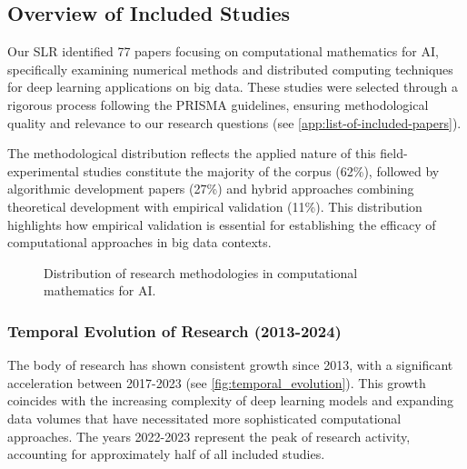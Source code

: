 \documentclass[acmsmall]{acmart}
\begin{document}
\subsection{Overview of Included Studies}\label{subsec:overview-of-included-studies}
Our SLR identified 77 papers focusing on computational mathematics for AI, specifically examining numerical methods and distributed computing techniques for deep learning applications on big data. These studies were selected through a rigorous process following the PRISMA guidelines, ensuring methodological quality and relevance to our research questions (see \cref{app:list-of-included-papers}).

The methodological distribution reflects the applied nature of this field-experimental studies constitute the majority of the corpus (62\%), followed by algorithmic development papers (27\%) and hybrid approaches combining theoretical development with empirical validation (11\%). This distribution highlights how empirical validation is essential for establishing the efficacy of computational approaches in big data contexts.

\begin{figure}[H]
    \centering
    \caption{Distribution of research methodologies in computational mathematics for AI.}
    \label{fig:methodology_distribution}
\end{figure}

\subsubsection{Temporal Evolution of Research (2013-2024)}\label{subsubsec:overview-of-included-studies:temporal-evolution-of-research-2016-2024}
The body of research has shown consistent growth since 2013, with a significant acceleration between 2017-2023 (see \cref{fig:temporal_evolution}). This growth coincides with the increasing complexity of deep learning models and expanding data volumes that have necessitated more sophisticated computational approaches. The years 2022-2023 represent the peak of research activity, accounting for approximately half of all included studies.
\end{document}
